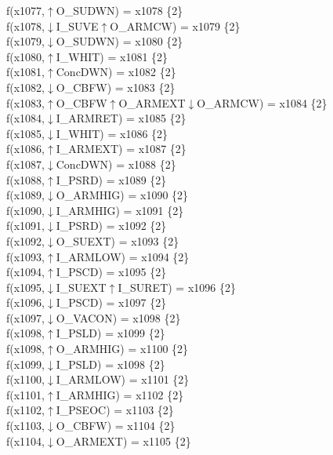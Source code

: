 f(x1077,$\uparrow$O\_SUDWN) = x1078 \{2\} \\  
f(x1078,$\downarrow$I\_SUVE$\uparrow$O\_ARMCW) = x1079 \{2\} \\  
f(x1079,$\downarrow$O\_SUDWN) = x1080 \{2\} \\  
f(x1080,$\uparrow$I\_WHIT) = x1081 \{2\} \\  
f(x1081,$\uparrow$ConcDWN) = x1082 \{2\} \\  
f(x1082,$\downarrow$O\_CBFW) = x1083 \{2\} \\  
f(x1083,$\uparrow$O\_CBFW$\uparrow$O\_ARMEXT$\downarrow$O\_ARMCW) = x1084 \{2\} \\  
f(x1084,$\downarrow$I\_ARMRET) = x1085 \{2\} \\  
f(x1085,$\downarrow$I\_WHIT) = x1086 \{2\} \\  
f(x1086,$\uparrow$I\_ARMEXT) = x1087 \{2\} \\  
f(x1087,$\downarrow$ConcDWN) = x1088 \{2\} \\  
f(x1088,$\uparrow$I\_PSRD) = x1089 \{2\} \\  
f(x1089,$\downarrow$O\_ARMHIG) = x1090 \{2\} \\  
f(x1090,$\downarrow$I\_ARMHIG) = x1091 \{2\} \\  
f(x1091,$\downarrow$I\_PSRD) = x1092 \{2\} \\  
f(x1092,$\downarrow$O\_SUEXT) = x1093 \{2\} \\  
f(x1093,$\uparrow$I\_ARMLOW) = x1094 \{2\} \\  
f(x1094,$\uparrow$I\_PSCD) = x1095 \{2\} \\  
f(x1095,$\downarrow$I\_SUEXT$\uparrow$I\_SURET) = x1096 \{2\} \\  
f(x1096,$\downarrow$I\_PSCD) = x1097 \{2\} \\  
f(x1097,$\downarrow$O\_VACON) = x1098 \{2\} \\  
f(x1098,$\uparrow$I\_PSLD) = x1099 \{2\} \\  
f(x1098,$\uparrow$O\_ARMHIG) = x1100 \{2\} \\  
f(x1099,$\downarrow$I\_PSLD) = x1098 \{2\} \\  
f(x1100,$\downarrow$I\_ARMLOW) = x1101 \{2\} \\  
f(x1101,$\uparrow$I\_ARMHIG) = x1102 \{2\} \\  
f(x1102,$\uparrow$I\_PSEOC) = x1103 \{2\} \\  
f(x1103,$\downarrow$O\_CBFW) = x1104 \{2\} \\  
f(x1104,$\downarrow$O\_ARMEXT) = x1105 \{2\} \\  
